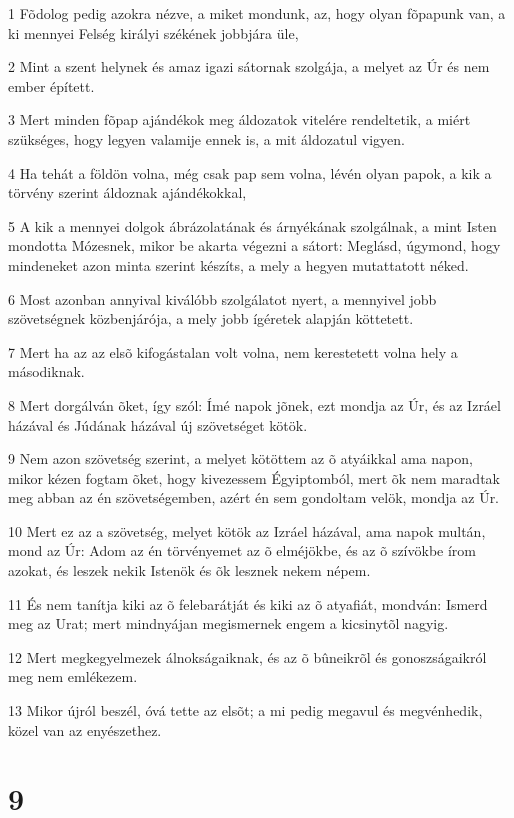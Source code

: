 \par 1 Fõdolog pedig azokra nézve, a miket mondunk, az, hogy olyan fõpapunk van, a ki mennyei Felség királyi székének jobbjára üle,
\par 2 Mint a szent helynek és amaz igazi sátornak szolgája, a melyet az Úr és nem ember épített.
\par 3 Mert minden fõpap ajándékok meg áldozatok vitelére rendeltetik, a miért szükséges, hogy legyen valamije ennek is, a mit áldozatul vigyen.
\par 4 Ha tehát a földön volna, még csak pap sem volna, lévén olyan papok, a kik a törvény szerint áldoznak ajándékokkal,
\par 5 A kik a mennyei dolgok ábrázolatának és árnyékának szolgálnak, a mint Isten mondotta Mózesnek, mikor be akarta végezni a  sátort: Meglásd, úgymond, hogy mindeneket azon minta szerint készíts, a mely a hegyen mutattatott néked.
\par 6 Most azonban annyival kiválóbb szolgálatot nyert, a mennyivel jobb szövetségnek közbenjárója, a mely jobb ígéretek alapján köttetett.
\par 7 Mert ha az az elsõ kifogástalan volt volna, nem kerestetett volna hely a másodiknak.
\par 8 Mert dorgálván õket, így szól: Ímé napok jõnek, ezt mondja az Úr, és az Izráel házával és Júdának házával új szövetséget kötök.
\par 9 Nem azon szövetség szerint, a melyet kötöttem az õ atyáikkal ama napon, mikor kézen fogtam õket, hogy kivezessem Égyiptomból, mert õk  nem maradtak meg abban az én szövetségemben, azért én sem gondoltam velök, mondja az Úr.
\par 10 Mert ez az a szövetség, melyet kötök az Izráel házával, ama napok multán, mond az Úr: Adom az én törvényemet az õ elméjökbe, és az õ szívökbe írom azokat, és leszek nekik Istenök és õk lesznek nekem népem.
\par 11 És nem tanítja kiki az õ felebarátját és kiki az õ atyafiát, mondván: Ismerd meg az Urat; mert mindnyájan megismernek engem a kicsinytõl nagyig.
\par 12 Mert megkegyelmezek álnokságaiknak, és az õ bûneikrõl és gonoszságaikról meg nem emlékezem.
\par 13 Mikor újról beszél, óvá tette az elsõt; a mi pedig megavul és megvénhedik, közel van az enyészethez.

\chapter{9}

